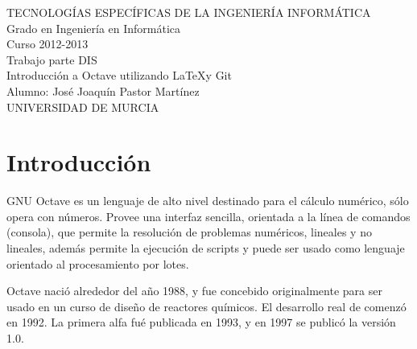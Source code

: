 \documentclass[a4,12pt,graphicx,caption,rotating]{article}
\begin{document}
\begin{titlepage}
 
\begin{center}
 
{\Large TECNOLOGÍAS ESPECÍFICAS DE LA INGENIERÍA INFORMÁTICA}\\
 
{\Large Grado en Ingeniería en Informática}\\[2cm]
 
{\Large Curso 2012-2013}\\[3cm]
 
{\Huge Trabajo parte DIS}\\
 
{\Huge Introducción a Octave utilizando \LaTeX y Git}\\[4cm]
 
{\Large Alumno: José Joaquín Pastor Martínez}\\[3cm]
 
{\Large UNIVERSIDAD DE MURCIA}
 
\end{center}
 
\end{titlepage}
 
\tableofcontents
\newpage

\section{Introducción}
GNU Octave es un lenguaje de alto nivel destinado para el cálculo numérico, sólo opera con números. Provee una interfaz sencilla, orientada a la línea de comandos (consola), que permite la resolución de problemas numéricos, lineales y no lineales, además permite la ejecución de scripts y puede ser usado como lenguaje orientado al procesamiento por lotes.

Octave nació alrededor del año 1988, y fue concebido originalmente para ser usado en un curso de diseño de reactores químicos. El desarrollo real de comenzó en 1992. La primera alfa fué publicada en 1993, y en 1997 se publicó la versión 1.0.
\end{document}
